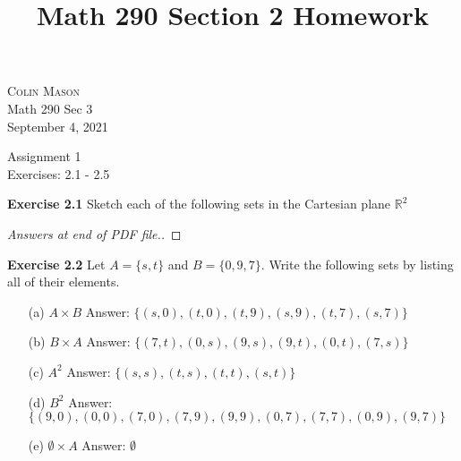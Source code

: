 \documentclass[12pt,oneside]{article}
\newenvironment{exercise}[1]{\vspace{.1in}\noindent\textbf{Exercise #1 \hspace{.05em}}}{}
\newcommand{\R}{\mathbb{R}}
\begin{document}
\title{Math 290 Section 2 Homework}

\begin{flushright}
\textsc{Colin Mason}  \\
Math 290 Sec 3\\
September 4, 2021
\end{flushright}

\begin{center}
\textsf{Assignment 1} \\
\textsf{Exercises: 2.1 - 2.5}
\end{center}


\begin{exercise}{2.1}
Sketch each of the following sets in the Cartesian plane $\R^2$


\end{exercise}

\begin{proof}[Answers at end of PDF file.]

\end{proof}


\begin{exercise}{2.2}
Let $A = \{s, t\} $ and $ B = \{0, 9, 7\}$. Write the following sets by listing
all of their elements.

\end{exercise}

\begin{itemize}
    \item[(a)] $A \times B$
    \subitem Answer: $\{(s, 0), (t, 0), (t, 9), (s, 9), (t, 7), (s, 7)\}$
    \item[(b)] $B \times A$  
    \subitem Answer: $\{(7, t), (0, s), (9, s), (9, t), (0, t), (7, s)\}$
    \item[(c)] $A^2$ 
    \subitem Answer: $\{(s, s), (t, s), (t, t), (s, t)\}$
    \item[(d)] $B^2$
    \subitem Answer: $\{(9, 0), (0, 0), (7, 0), (7, 9), (9, 9), (0, 7), (7, 7), (0, 9), (9, 7)\}$
    \item[(e)] $\emptyset \times A$
    \subitem Answer: $\emptyset$
    

\end{itemize}

\end{document}
